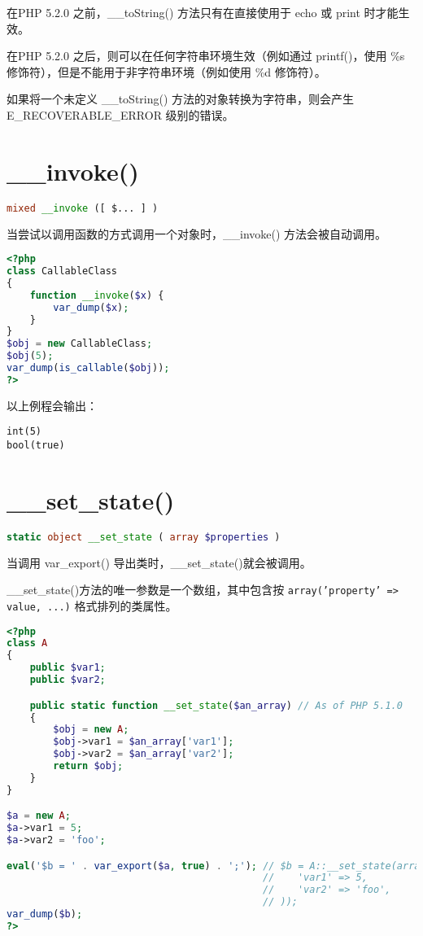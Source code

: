 \begin{compactitem}
\item 在PHP 5.2.0 之前，\_\_toString() 方法只有在直接使用于 echo 或 print 时才能生效。
\item 在PHP 5.2.0 之后，则可以在任何字符串环境生效（例如通过 printf()，使用 \%s 修饰符），但是不能用于非字符串环境（例如使用 \%d 修饰符）。
\end{compactitem}


如果将一个未定义 \_\_toString() 方法的对象转换为字符串，则会产生 E\_RECOVERABLE\_ERROR 级别的错误。

\section{\_\_invoke()}


\begin{lstlisting}[language=PHP]
mixed __invoke ([ $... ] )
\end{lstlisting}

当尝试以调用函数的方式调用一个对象时，\_\_invoke() 方法会被自动调用。

\begin{lstlisting}[language=PHP]
<?php
class CallableClass 
{
    function __invoke($x) {
        var_dump($x);
    }
}
$obj = new CallableClass;
$obj(5);
var_dump(is_callable($obj));
?>
\end{lstlisting}

以上例程会输出：

\begin{verbatim}
int(5)
bool(true)
\end{verbatim}

\section{\_\_set\_state()}


\begin{lstlisting}[language=PHP]
static object __set_state ( array $properties )
\end{lstlisting}

当调用 var\_export() 导出类时，\_\_set\_state()就会被调用。


\_\_set\_state()方法的唯一参数是一个数组，其中包含按 \texttt{array('property' => value, ...)} 格式排列的类属性。

\begin{lstlisting}[language=PHP]
<?php
class A
{
    public $var1;
    public $var2;

    public static function __set_state($an_array) // As of PHP 5.1.0
    {
        $obj = new A;
        $obj->var1 = $an_array['var1'];
        $obj->var2 = $an_array['var2'];
        return $obj;
    }
}

$a = new A;
$a->var1 = 5;
$a->var2 = 'foo';

eval('$b = ' . var_export($a, true) . ';'); // $b = A::__set_state(array(
                                            //    'var1' => 5,
                                            //    'var2' => 'foo',
                                            // ));
var_dump($b);
?>
\end{lstlisting}

